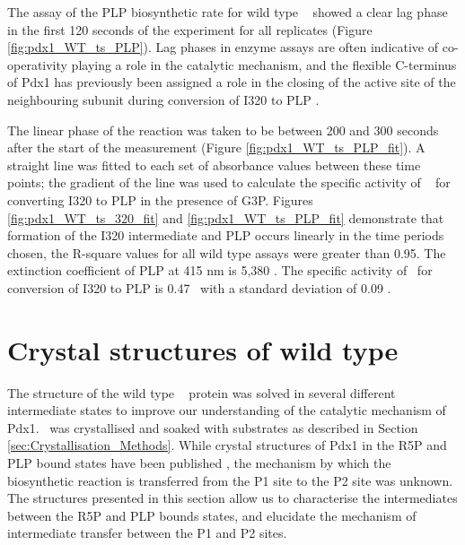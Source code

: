 The assay of the PLP biosynthetic rate for wild type \atpdx~ showed a clear lag phase in the first 120 seconds of the experiment for all replicates (Figure \ref{fig:pdx1_WT_ts_PLP}). Lag phases in enzyme assays are often indicative of co-operativity playing a role in the catalytic mechanism, and the flexible C-terminus of Pdx1 has previously been assigned a role in the closing of the active site of the neighbouring subunit during conversion of I320 to PLP \cite{Raschle2009}. 

The linear phase of the reaction was taken to be between 200 and 300 seconds after the start of the measurement (Figure \ref{fig:pdx1_WT_ts_PLP_fit}). A straight line was fitted to each set of absorbance values between these time points; the gradient of the line was used to calculate the specific activity of \atpdx~ for converting I320 to PLP in the presence of G3P. Figures \ref{fig:pdx1_WT_ts_320_fit} and \ref{fig:pdx1_WT_ts_PLP_fit} demonstrate that formation of the I320 intermediate and PLP occurs linearly in the time periods chosen, the R-square values for all wild type assays were greater than 0.95. The extinction coefficient of PLP at 415 nm is 5,380 \cite{Raschle2007}. The specific activity of \atpdx ~for conversion of I320 to PLP is 0.47 \act ~with a standard deviation of 0.09 \act. %

   



\clearpage
\section{Crystal structures of wild type \atpdx}

The structure of the wild type \atpdx~ protein was solved in several different intermediate states to improve our understanding of the catalytic mechanism of Pdx1. \atpdx ~was crystallised and soaked with substrates as described in Section \ref{sec:Crystallisation_Methods}. While crystal structures of Pdx1 in the R5P and PLP bound states have been published \cite{Guedez2012,Smith2015}, the mechanism by which the biosynthetic reaction is transferred from the P1 site to the P2 site was unknown. The structures presented in this section allow us to characterise the intermediates between the R5P and PLP bounds states, and elucidate the mechanism of intermediate transfer between the P1 and P2 sites.

